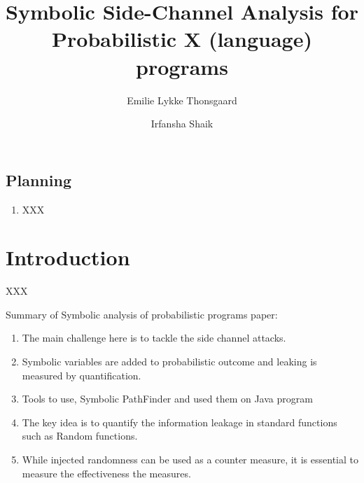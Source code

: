 \documentclass[11pt]{report}
\title{Symbolic Side-Channel Analysis for Probabilistic X (language) programs}
\author{Emilie Lykke Thonsgaard \and Irfansha Shaik}
\begin{document}
\maketitle

\section{Planning}
\label{sec:planning}

\begin{enumerate}
\item XXX
\end{enumerate}

\chapter{Introduction}
\label{cha:introduction}

XXX

Summary of Symbolic analysis of probabilistic programs paper:
\begin{enumerate}
\item The main challenge here is to tackle the side channel attacks.
\item Symbolic variables are added to probabilistic outcome and leaking is measured by quantification.
\item Tools to use, Symbolic PathFinder and used them on Java program
\item The key idea is to quantify the information leakage in standard functions such as Random functions.
\item While injected randomness can be used as a counter measure, it is essential to measure the effectiveness the measures.
\end{enumerate}




\end{document}
